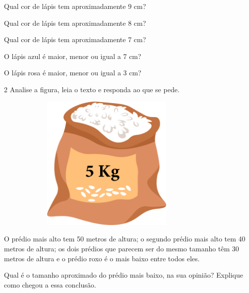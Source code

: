\begin{escolha}
\item  Qual cor de lápis tem aproximadamente 9 cm?


\item  Qual cor de lápis tem aproximadamente 8 cm?


\item  Qual cor de lápis tem aproximadamente 7 cm?


\item  O lápis azul é maior, menor ou igual a 7 cm?


\item  O lápis rosa é maior, menor ou igual a 3 cm?

\end{escolha}

\num{2} Analise a figura, leia o texto e responda ao que se pede.


\includegraphics[width=4.31250in,height=2.59651in]{media/image43.png}

O prédio mais alto tem 50 metros de altura; o segundo prédio mais alto
tem 40 metros de altura; os dois prédios que parecem ser do mesmo
tamanho têm 30 metros de altura e o prédio roxo é o mais baixo entre
todos eles.

Qual é o tamanho aproximado do prédio mais baixo, na sua opinião?
Explique como chegou a essa conclusão.


